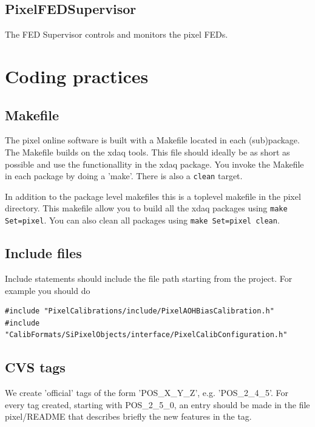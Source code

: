 \subsection{PixelFEDSupervisor}

The FED Supervisor controls and monitors the pixel FEDs.




\section{Coding practices}

\subsection{Makefile}

The pixel online software is built with a
Makefile located in each (sub)package. The
Makefile builds on the xdaq tools. This
file should ideally be as short as possible
and use the functionallity in the xdaq package.
You invoke the Makefile in each package by 
doing a 'make'. There is also a {\tt clean} target.

In addition to the package level makefiles 
this is a toplevel makefile in the pixel
directory. This makefile allow you to build 
all the xdaq packages using {\tt make Set=pixel}.
You can also clean all packages using 
{\tt make Set=pixel clean}.

\subsection{Include files}

Include statements should include the file path 
starting from the project. For example you should do

\begin{verbatim}
#include "PixelCalibrations/include/PixelAOHBiasCalibration.h"
#include "CalibFormats/SiPixelObjects/interface/PixelCalibConfiguration.h"
\end{verbatim}

\subsection{CVS tags}

We create 'official' tags of the form 'POS\_X\_Y\_Z',
e.g. 'POS\_2\_4\_5'. For every tag created, starting
with POS\_2\_5\_0, an entry should be made in the
file pixel/README that describes briefly the new
features in the tag.


